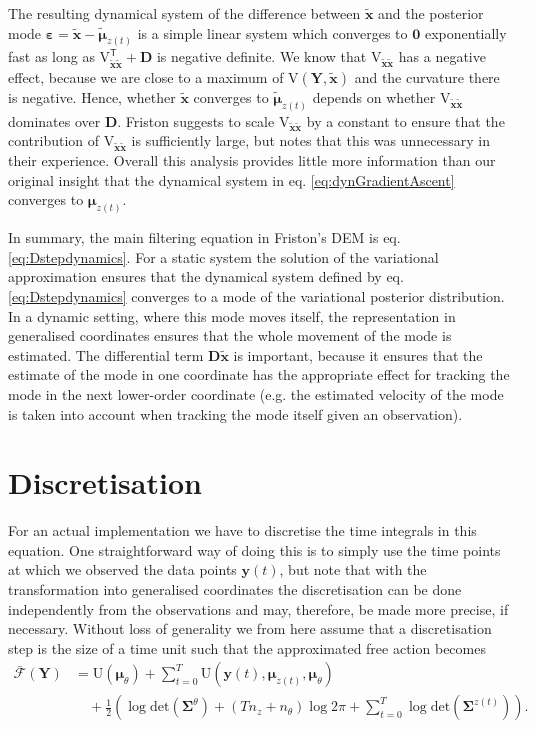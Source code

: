 \documentclass[a4paper,10pt]{article}
\newcommand{\bs}[1]{\mathbf{#1}}					%
\newcommand{\bgs}[1]{\boldsymbol{#1}}				%
\newcommand{\tr}{\mathsf{T}}				%
\newcommand{\gc}[1]{\tilde{#1}} %
\renewcommand{\ss}{z}         %
\newcommand{\so}{y}         %
\newcommand{\sh}{x}         %
\newcommand{\spm}{\mu}    %
\renewcommand{\sp}{\theta}    %
\newcommand{\po}{\bs{\so}}    %
\newcommand{\ph}{\bs{\sh}}    %
\newcommand{\ppm}{\bgs{\spm}}   %
\newcommand{\phg}{\gc{\ph}}    %
\newcommand{\ppmg}{\gc{\ppm}} %
\newcommand{\Po}{\bs{Y}}    %
\newcommand{\D}{\bs{D}}				%
\newcommand{\U}{\mathrm{U}}			%
\newcommand{\V}{\mathrm{V}}			%
\newcommand{\Fa}{\bar{\mathcal{F}}}		%
\newcommand{\Cov}{\bgs{\Sigma}}			%
\renewcommand{\det}[1]{\mathrm{det}(#1)}	%
\begin{document}
The resulting dynamical system of the difference between $\phg$ and the posterior mode $\bgs{\varepsilon} = \phg - \ppmg_{\ss(t)}$ is a simple linear system which converges to $\bs{0}$ exponentially fast as long as $\V_{\phg\phg}^\tr + \D$ is negative definite. We know that $\V_{\phg\phg}$ has a negative effect, because we are close to a maximum of $\V(\Po,\phg)$ and the curvature there is negative. Hence, whether $\phg$ converges to $\ppmg_{\ss(t)}$ depends on whether $\V_{\phg\phg}$ dominates over $\D$. Friston suggests to scale $\V_{\phg\phg}$ by a constant to ensure that the contribution of $\V_{\phg\phg}$ is sufficiently large, but notes that this was unnecessary in their experience. Overall this analysis provides little more information than our original insight that the dynamical system in eq. \eqref{eq:dynGradientAscent} converges to $\ppm_{\ss(t)}$.

In summary, the main filtering equation in Friston's DEM is eq. \eqref{eq:Dstepdynamics}. For a static system the solution of the variational approximation ensures that the dynamical system defined by eq. \eqref{eq:Dstepdynamics} converges to a mode of the variational posterior distribution. In a dynamic setting, where this mode moves itself, the representation in generalised coordinates ensures that the whole movement of the mode is estimated. The differential term $\D\phg$ is important, because it ensures that the estimate of the mode in one coordinate has the appropriate effect for tracking the mode in the next lower-order coordinate (e.g. the estimated velocity of the mode is taken into account when tracking the mode itself given an observation). 


\section{Discretisation}
For an actual implementation we have to discretise the time integrals in this equation. One straightforward way of doing this is to simply use the time points at which we observed the data points $\po(t)$, but note that with the transformation into generalised coordinates the discretisation can be done independently from the observations and may, therefore, be made more precise, if necessary. Without loss of generality we from here assume that a discretisation step is the size of a time unit such that the approximated free action becomes
\begin{align}
    \Fa(\Po) &= \label{eq:approxFreeActionDisc} \U(\bgs{\mu}_\sp) + \sum_{t=0}^T  \U(\po(t),\bgs{\mu}_{\ss(t)},\bgs{\mu}_\sp) \nonumber\\
    &\quad + \frac{1}{2} \left(\log \det{\Cov^\sp} + (Tn_\ss + n_{\sp}) \log 2\pi + \sum_{t=0}^T \log \det{\Cov^{\ss(t)}}\right).
\end{align}




\end{document}
